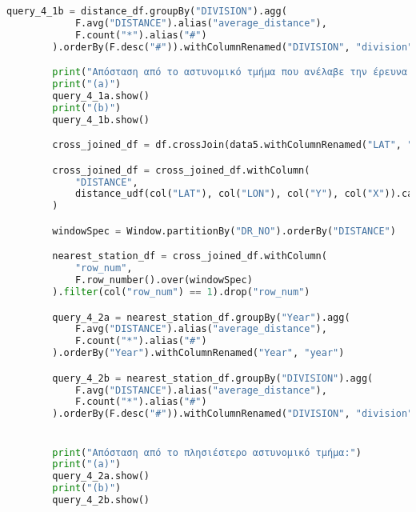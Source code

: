 \documentclass{article}
\begin{document}
\begin{lstlisting}[language = Python]
        query_4_1b = distance_df.groupBy("DIVISION").agg(
            F.avg("DISTANCE").alias("average_distance"),
            F.count("*").alias("#")
        ).orderBy(F.desc("#")).withColumnRenamed("DIVISION", "division")

        print("Απόσταση από το αστυνομικό τμήμα που ανέλαβε την έρευνα για το περιστατικό:")
        print("(a)")
        query_4_1a.show() 
        print("(b)")
        query_4_1b.show() 

        cross_joined_df = df.crossJoin(data5.withColumnRenamed("LAT", "Y").withColumnRenamed("LON", "X"))

        cross_joined_df = cross_joined_df.withColumn(
            "DISTANCE",
            distance_udf(col("LAT"), col("LON"), col("Y"), col("X")).cast("double")
        )

        windowSpec = Window.partitionBy("DR_NO").orderBy("DISTANCE")

        nearest_station_df = cross_joined_df.withColumn(
            "row_num",
            F.row_number().over(windowSpec)
        ).filter(col("row_num") == 1).drop("row_num")

        query_4_2a = nearest_station_df.groupBy("Year").agg(
            F.avg("DISTANCE").alias("average_distance"),
            F.count("*").alias("#")
        ).orderBy("Year").withColumnRenamed("Year", "year")

        query_4_2b = nearest_station_df.groupBy("DIVISION").agg(
            F.avg("DISTANCE").alias("average_distance"),
            F.count("*").alias("#")
        ).orderBy(F.desc("#")).withColumnRenamed("DIVISION", "division")


        print("Απόσταση από το πλησιέστερο αστυνομικό τμήμα:")
        print("(a)")
        query_4_2a.show()
        print("(b)")
        query_4_2b.show()

\end{lstlisting}
\end{document}
